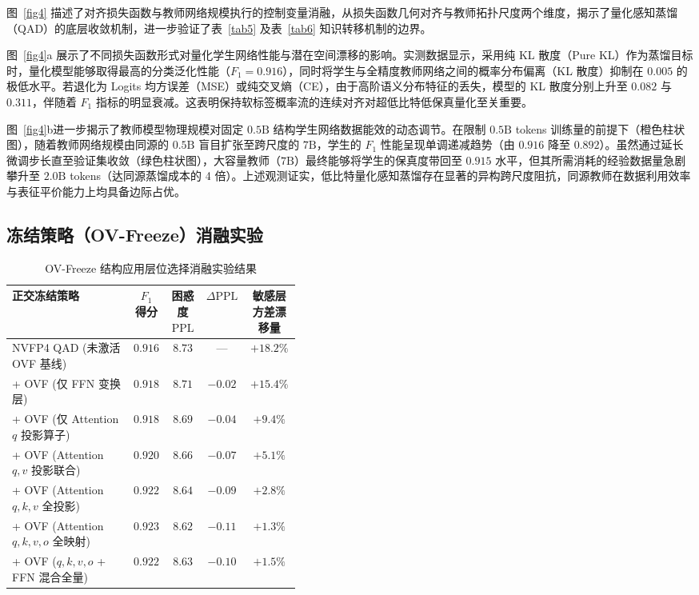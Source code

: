 \documentclass[11pt, a4paper]{article}
\begin{document}
图~\ref{fig4} 描述了对齐损失函数与教师网络规模执行的控制变量消融，从损失函数几何对齐与教师拓扑尺度两个维度，揭示了量化感知蒸馏（QAD）的底层收敛机制，进一步验证了表~\ref{tab5} 及表~\ref{tab6} 知识转移机制的边界。

图~\ref{fig4}a 展示了不同损失函数形式对量化学生网络性能与潜在空间漂移的影响。实测数据显示，采用纯 KL 散度（Pure KL）作为蒸馏目标时，量化模型能够取得最高的分类泛化性能（$F_1 = 0.916$），同时将学生与全精度教师网络之间的概率分布偏离（KL 散度）抑制在 $0.005$ 的极低水平。若退化为 Logits 均方误差（MSE）或纯交叉熵（CE），由于高阶语义分布特征的丢失，模型的 KL 散度分别上升至 $0.082$ 与 $0.311$，伴随着 $F_1$ 指标的明显衰减。这表明保持软标签概率流的连续对齐对超低比特低保真量化至关重要。

图~\ref{fig4}b进一步揭示了教师模型物理规模对固定 $0.5\mathrm{B}$ 结构学生网络数据能效的动态调节。在限制 $0.5\mathrm{B}$ tokens 训练量的前提下（橙色柱状图），随着教师网络规模由同源的 $0.5\mathrm{B}$ 盲目扩张至跨尺度的 $7\mathrm{B}$，学生的 $F_1$ 性能呈现单调递减趋势（由 $0.916$ 降至 $0.892$）。虽然通过延长微调步长直至验证集收敛（绿色柱状图），大容量教师（$7\mathrm{B}$）最终能够将学生的保真度带回至 $0.915$ 水平，但其所需消耗的经验数据量急剧攀升至 $2.0\mathrm{B}$ tokens（达同源蒸馏成本的 4 倍）。上述观测证实，低比特量化感知蒸馏存在显著的异构跨尺度阻抗，同源教师在数据利用效率与表征平价能力上均具备边际占优。

\subsection{冻结策略（OV-Freeze）消融实验}

\begin{table}[htbp]
\centering
\caption{OV-Freeze 结构应用层位选择消融实验结果}
\label{tab:ovf_layer_ablation}
\small
\renewcommand{\arraystretch}{1.15}
\begin{tabular}{>{\raggedright\arraybackslash}p{0.42\linewidth}cccc}
\toprule
\textbf{正交冻结策略} & \textbf{$F_1$ 得分} & \textbf{困惑度 $\mathrm{PPL}$} & \textbf{$\Delta\mathrm{PPL}$} & \textbf{敏感层方差漂移量} \\
\midrule
NVFP4 QAD (未激活 OVF 基线) & $0.916$ & $8.73$ & — & $+18.2\%$ \\
+ OVF (仅 FFN 变换层) & $0.918$ & $8.71$ & $-0.02$ & $+15.4\%$ \\
+ OVF (仅 Attention $q$ 投影算子) & $0.918$ & $8.69$ & $-0.04$ & $+9.4\%$ \\
+ OVF (Attention $q, v$ 投影联合) & $0.920$ & $8.66$ & $-0.07$ & $+5.1\%$ \\
+ OVF (Attention $q, k, v$ 全投影) & $0.922$ & $8.64$ & $-0.09$ & $+2.8\%$ \\
+ OVF (Attention $q, k, v, o$ 全映射) & $\mathbf{0.923}$ & $\mathbf{8.62}$ & $\mathbf{-0.11}$ & $\mathbf{+1.3\%}$ \\
+ OVF ($q, k, v, o$ + FFN 混合全量) & $0.922$ & $8.63$ & $-0.10$ & $+1.5\%$ \\
\bottomrule
\end{tabular}
\end{table}
\end{document}
